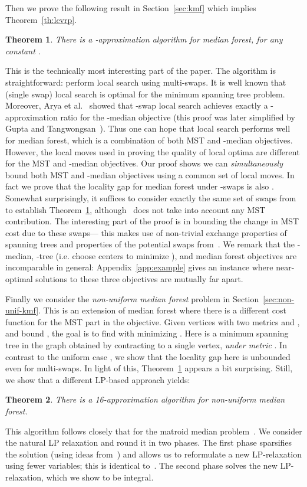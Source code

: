 \documentclass[11pt,twoside,a4paper]{article}
\newtheorem{theorem}{Theorem}
\def\kmf{ median forest\xspace}
\begin{document}
Then we prove the following result in Section~\ref{sec:kmf} which implies Theorem~\ref{th:lcvrp}.
\begin{theorem}\label{th:kmed-forest}
There is a -approximation algorithm for  median forest, for any constant .
\end{theorem}
This is the technically most interesting part of the paper. The algorithm is straightforward: perform local search
using multi-swaps. It is well known that (single swap) local search is optimal for the minimum spanning tree problem.
Moreover, Arya et al.~\cite{AGKMMP04} showed that -swap local search achieves exactly a -approximation
ratio for the -median objective (this proof was later simplified by Gupta and Tangwongsan~\cite{GT08}). Thus one can
hope that local search performs well for  median forest, which is a combination of both MST and -median
objectives. However, the local moves used in proving the quality of local optima are different for the MST and
-median objectives. Our proof shows we can {\em simultaneously} bound both MST and -median objectives using a
common set of local moves. In fact we prove that the locality gap for \kmf under -swaps is also .
Somewhat surprisingly, it suffices to consider exactly the same set of swaps from~\cite{GT08} to establish
Theorem~\ref{th:kmed-forest}, although~\cite{GT08} does not take into account any MST contribution. The interesting
part of the proof is in bounding the change in MST cost due to these swaps--- this makes use of non-trivial exchange
properties of spanning trees and properties of the potential swaps from~\cite{GT08}. We remark that the -median,
-tree (i.e. choose  centers  to minimize ), and \kmf objectives are incomparable in general:
Appendix~\ref{app:example} gives an instance where near-optimal solutions to these three objectives are mutually far
apart.

Finally we consider the {\em non-uniform   median forest} problem in Section~\ref{sec:non-unif-kmf}. This is an
extension of  median forest where there is a different cost function  for the MST part in the objective. Given
vertices  with two metrics  and , and bound , the goal is to find  with  minimizing
. Here  is a minimum spanning tree in the
graph obtained by contracting  to a single vertex, {\em under metric }. In contrast to the uniform case , we
show that the locality gap here is unbounded even for multi-swaps. In light of this, Theorem~\ref{th:kmed-forest}
appears a bit surprising. Still, we show that a different LP-based approach yields:
\begin{theorem}\label{th:gen-kmed-forest}
There is a 16-approximation algorithm for non-uniform  median forest.
\end{theorem}
This algorithm follows closely that for the matroid median problem~\cite{KKNSS11}. We consider the natural LP
relaxation and round it in two phases. The first phase sparsifies the solution (using ideas from~\cite{CGTS99}) and
allows us to reformulate a new LP-relaxation using fewer variables; this is identical to~\cite{KKNSS11}. The second
phase solves the new LP-relaxation, which we show  to be integral.
\end{document}
